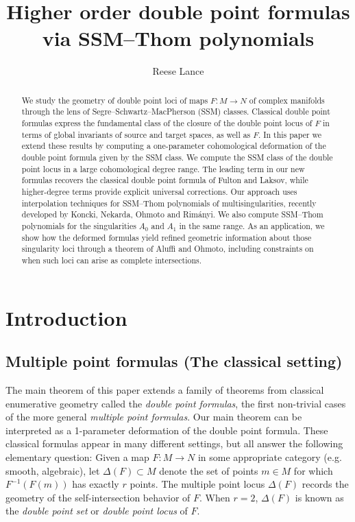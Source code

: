 \documentclass[11pt]{article}
\title{Higher order double point formulas via SSM–Thom polynomials}
\author{Reese Lance}
\date{}
\theoremstyle{plain}
\theoremstyle{definition}
\theoremstyle{definition}
\begin{document}
\maketitle

\begin{abstract}
We study the geometry of double point loci of maps $F:M\to N$ of complex manifolds through the lens of Segre–Schwartz–MacPherson (SSM) classes. Classical double point formulas express the fundamental class of the closure of the double point locus of $F$ in terms of global invariants of source and target spaces, as well as $F$. In this paper we extend these results by computing a one-parameter cohomological deformation of the double point formula given by the SSM class. We compute the SSM class of the double point locus in a large cohomological degree range. The leading term in our new formulas recovers the classical double point formula of Fulton and Laksov, while higher-degree terms provide explicit universal corrections. Our approach uses interpolation techniques for SSM–Thom polynomials of multisingularities, recently developed by Koncki, Nekarda, Ohmoto and Rim\'anyi. We also compute SSM–Thom polynomials for the singularities $A_0$ and $A_1$ in the same range. As an application, we show how the deformed formulas yield refined geometric information about those singularity loci through a theorem of Aluffi and Ohmoto, 
including constraints on when such loci can arise as complete intersections. 
\end{abstract}

\tableofcontents

\section{Introduction}
\subsection{Multiple point formulas (The classical setting)}
The main theorem of this paper extends a family of theorems from classical enumerative geometry called the \textit{double point formulas}, the first non-trivial cases of the more general \textit{multiple point formulas}. Our main theorem can be interpreted as a 1-parameter deformation of the double point formula. These classical formulas appear in many different settings, but all answer the following elementary question: Given a map $F: M\to N$ in some appropriate category (e.g. smooth, algebraic), let $\Delta(F) \subset M$ denote the set of points $m\in M$ for which $F^{-1}(F(m))$ has exactly $r$ points. The multiple point locus $\Delta(F)$ records the geometry of the self-intersection behavior of $F$. When $r=2$, $\Delta(F)$ is known as the \textit{double point set} or \textit{double point locus} of $F$.
\end{document}
